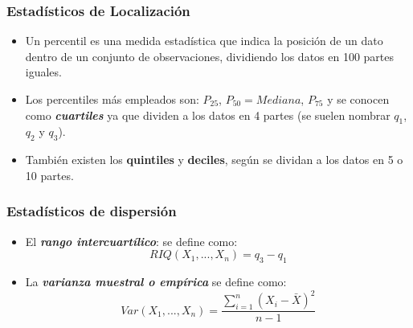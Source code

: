 \documentclass{beamer}
\begin{document}
\begin{frame}
\frametitle{Estadísticos de  Localización}

\begin{itemize}
\item Un percentil es una medida estadística que indica la posición de un dato dentro de un conjunto de observaciones, dividiendo los datos en 100 partes iguales.
\item Los percentiles más empleados son: $P_{25}$, $P_{50}=Mediana$, $P_{75}$ y se conocen como \textbf{\textit{{\color{blue}cuartiles}}}
ya que dividen a los datos en 4 partes (se suelen nombrar $q_1$, $q_2$ y
 $q_3$).
\item También existen los \textbf{{\color{blue}quintiles} }y \textbf{{\color{blue}deciles}}, según se dividan a los datos en 5 o 10 partes.
\end{itemize}

\end{frame}









\begin{frame}
\frametitle{Estadísticos de dispersión }

\begin{itemize}
\item El \textit{\textbf{rango intercuartílico}}: se define como: \[RIQ(X_1,...,X_n)=q_3-q_1\]
\item La \textit{\textbf{varianza muestral o empírica}} se define como:
\[Var(X_1,...,X_n)=\frac{\sum_{i=1}^n (X_i-\bar{X})^2}{n-1}\]
\end{itemize}

\end{frame}
\end{document}
